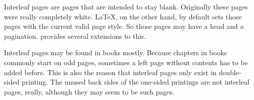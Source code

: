 Interleaf pages are pages that are intended to stay blank. Originally these
pages were really completely white. \LaTeX{}, on the other hand, by default
sets those pages with the current valid page style. So those pages may have a
head and a pagination. \KOMAScript{} provides several extensions to this.

Interleaf pages may be found in books mostly. Because chapters in books
commonly start on odd pages, sometimes a left page without contents has to be
added before. This is also the reason that interleaf pages only exist in
double-sided printing. The unused back sides of the one-sided printings are
not interleaf pages, really, although they may seem to be such pages.

%


